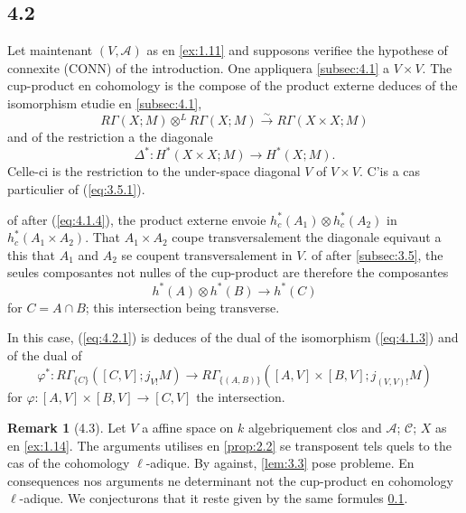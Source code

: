 \documentclass[11pt,a4paper]{article}
\theoremstyle{plain}
\theoremstyle{definition}
\newtheorem{remark}[theorem]{Remark}
\begin{document}
\subsection{4.2}\label{subsec:4.2}

Let maintenant $(V,\mathcal{A})$ as en \ref{ex:1.11} and supposons verifiee the hypothese of connexite (CONN) of the introduction. One appliquera \ref{subsec:4.1} a $V \times V$. The cup-product en cohomology is the compose of the product externe deduces of the isomorphism etudie en \ref{subsec:4.1},
\[R\Gamma(X;M) \otimes^L R\Gamma(X;M) \xrightarrow{\sim} R\Gamma(X \times X;M)\]
and of the restriction a the diagonale
\[\Delta^*: H^*(X \times X;M) \longrightarrow H^*(X;M).\]
Celle-ci is the restriction to the under-space diagonal $V$ of $V \times V$. C'is a cas particulier of (\ref{eq:3.5.1}).

of after (\ref{eq:4.1.4}), the product externe envoie $h^*_c(A_1) \otimes h^*_c(A_2)$ in $h^*_c(A_1 \times A_2)$. That $A_1 \times A_2$ coupe transversalement the diagonale equivaut a this that $A_1$ and $A_2$ se coupent transversalement in $V$. of after \ref{subsec:3.5}, the seules composantes not nulles of the cup-product are therefore the composantes
\begin{equation}\label{eq:4.2.1}
h^*(A) \otimes h^*(B) \longrightarrow h^*(C)
\tag{4.2.1}
\end{equation}
for $C = A \cap B$; this intersection being transverse.

In this case, (\ref{eq:4.2.1}) is deduces of the dual of the isomorphism (\ref{eq:4.1.3}) and of the dual of
\[\varphi^*: R\Gamma_{\{C\}}([C,V];j_{V!}M) \longrightarrow R\Gamma_{\{(A,B)\}}([A,V] \times [B,V];j_{(V,V)!}M)\]
for $\varphi: [A,V] \times [B,V] \to [C,V]$ the intersection.

\begin{remark}[4.3]\label{rem:4.3}
Let $V$ a affine space on $k$ algebriquement clos and $\mathcal{A}$; $\mathcal{C}$; $X$ as en \ref{ex:1.14}. The arguments utilises en \ref{prop:2.2} se transposent tels quels to the cas of the cohomology $\ell$-adique. By against, \ref{lem:3.3} pose probleme. En consequences nos arguments ne determinant not the cup-product en cohomology $\ell$-adique. We conjecturons that it reste given by the same formules \ref{subsec:4.2}.
\end{remark}
\end{document}
